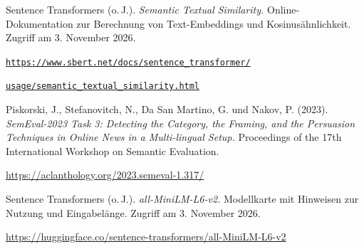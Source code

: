\documentclass[10pt,a4paper]{article}
\begin{document}
\begin{description}[font=\normalfont,leftmargin=8mm,labelwidth=6mm,labelsep=2mm,
  itemsep=12pt,parsep=3pt,topsep=8pt]
  \item[{[4]}] \hypertarget{quelle-sbert}{}Sentence Transformers (o.\,J.).
    \textit{Semantic Textual Similarity.}
    Online-Dokumentation zur Berechnung von Text-Embeddings und Kosinusähnlichkeit.
    Zugriff am 3. November 2026.\par
    {\small
    \href{https://www.sbert.net/docs/sentence_transformer/usage/semantic_textual_similarity.html}{\nolinkurl{https://www.sbert.net/docs/sentence_transformer/}}\par
    \href{https://www.sbert.net/docs/sentence_transformer/usage/semantic_textual_similarity.html}{\nolinkurl{usage/semantic_textual_similarity.html}}}
  \item[{[5]}] Piskorski, J., Stefanovitch, N., Da San Martino, G. und Nakov, P. (2023).
    \textit{SemEval-2023 Task 3: Detecting the Category, the Framing, and the Persuasion
    Techniques in Online News in a Multi-lingual Setup.}
    Proceedings of the 17th International Workshop on Semantic Evaluation.\par
    {\small\url{https://aclanthology.org/2023.semeval-1.317/}}
  \item[{[6]}] Sentence Transformers (o.\,J.).
    \textit{all-MiniLM-L6-v2.} Modellkarte mit Hinweisen zur Nutzung und Eingabelänge.
    Zugriff am 3. November 2026.\par
    {\small\url{https://huggingface.co/sentence-transformers/all-MiniLM-L6-v2}}
\end{description}
\end{document}
